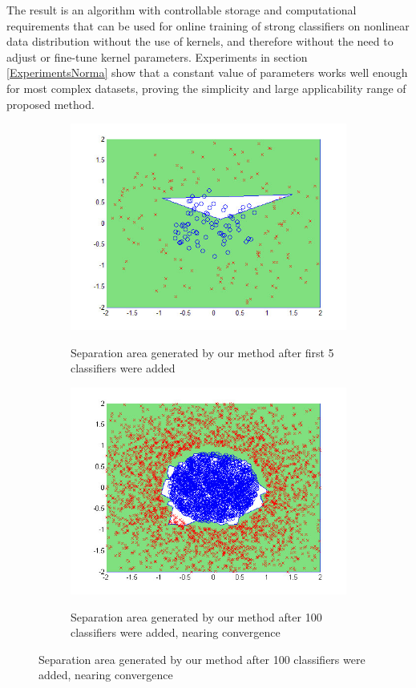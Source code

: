The result is an algorithm with controllable storage and computational requirements that can be used for online training of strong classifiers on nonlinear data distribution without the use of kernels, and therefore without the need to adjust or fine-tune kernel parameters. Experiments in section \ref{ExperimentsNorma} show that a constant value of parameters works well enough for most complex datasets, proving the simplicity and large applicability range of proposed method. 
\begin{figure}[t]
    \centering
\begin{subfigure}[b]{.45\linewidth}
       \includegraphics[width=0.9\linewidth]{c1}
\label{Contour1}
        \caption{Separation area generated by our method after first 5 classifiers were added}
      \end{subfigure}%
\hspace{.01\linewidth}
\begin{subfigure}[b]{.45\linewidth}
	 \includegraphics[width=0.9\linewidth]{c2}
       \label{Contour2}
      \caption{Separation area generated by our method after 100 classifiers were added, nearing convergence}
  

\end{subfigure}
\end{figure}
